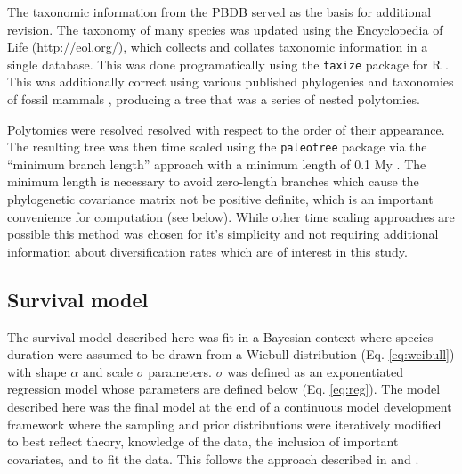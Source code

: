 \documentclass[12pt,letterpaper]{article}
\begin{document}
The taxonomic information from the PBDB served as the basis for additional revision. The taxonomy of many species was updated using the Encyclopedia of Life (\url{http://eol.org/}), which collects and collates taxonomic information in a single database. This was done programatically using the \texttt{taxize} package for R \citep{2013taxize}. This was additionally correct using various published phylogenies and taxonomies of fossil mammals \citep{Raia2012f,Janis1998,Janis2008}, producing a tree that was a series of nested polytomies. 

Polytomies were resolved resolved with respect to the order of their appearance. The resulting tree was then time scaled using the \texttt{paleotree} package via the ``minimum branch length'' approach with a minimum length of 0.1 My \citep{Bapst2012a}. The minimum length is necessary to avoid zero-length branches which cause the phylogenetic covariance matrix not be positive definite, which is an important convenience for computation (see below). While other time scaling approaches are possible \citep{Bapst2013a,Hedman2010} this method was chosen for it's simplicity and not requiring additional information about diversification rates which are of interest in this study. 



\subsection{Survival model}

The survival model described here was fit in a Bayesian context where species duration were assumed to be drawn from a Wiebull distribution (Eq. \ref{eq:weibull}) with shape \(\alpha\) and scale \(\sigma\) parameters. \(\sigma\) was defined as an exponentiated regression model whose parameters are defined below (Eq. \ref{eq:reg}). The model described here was the final model at the end of a continuous model development framework where the sampling and prior distributions were iteratively modified to best reflect theory, knowledge of the data, the inclusion of important covariates, and to fit the data. This follows the approach described in \citet{Gelman2007} and \citet{Gelman2013d}.
\end{document}
